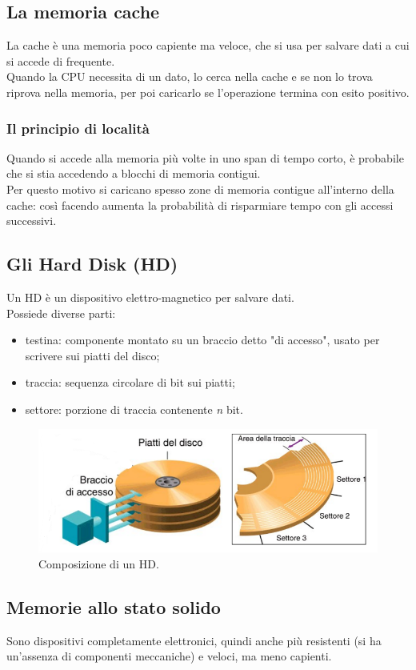\documentclass[12pt]{article}
\begin{document}
\subsection{La memoria cache}
La cache è una memoria poco capiente ma veloce, che si usa per salvare dati a cui si accede di frequente.\\
Quando la CPU necessita di un dato, lo cerca nella cache e se non lo trova riprova nella memoria, per poi caricarlo se l'operazione termina con esito positivo.
\subsubsection{Il principio di località}
Quando si accede alla memoria più volte in uno span di tempo corto, è probabile che si stia accedendo a blocchi di memoria contigui.\\
Per questo motivo si caricano spesso zone di memoria contigue all'interno della cache: così facendo aumenta la probabilità di risparmiare tempo con gli accessi successivi.
\pagebreak
\subsection{Gli Hard Disk (HD)}
Un HD è un dispositivo elettro-magnetico per salvare dati.\\
Possiede diverse parti:
\begin{itemize}
    \item testina: componente montato su un braccio detto "di accesso", usato per scrivere sui piatti del disco;
    \item traccia: sequenza circolare di bit sui piatti;
    \item settore: porzione di traccia contenente \textit{n} bit.
\end{itemize}
\begin{figure}[!htb]
    \centering
    \includegraphics[width=.9\textwidth, height=.7\textheight,keepaspectratio]{organizzazione_elab/hd.png} %
    \begin{center}
        \caption{\label{fig:hd_struttura}Composizione di un HD.} %
    \end{center}
\end{figure}
\subsection{Memorie allo stato solido}
Sono dispositivi completamente elettronici, quindi anche più resistenti (si ha un'assenza di componenti meccaniche) e veloci, ma meno capienti.
\end{document}
